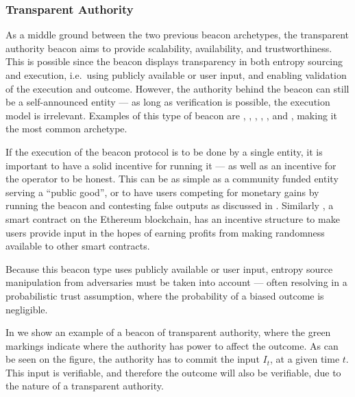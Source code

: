 \subsubsection{Transparent Authority}\label{ssub:transparent_authority}
As a middle ground between the two previous beacon archetypes, the transparent authority beacon aims to provide scalability, availability, and trustworthiness.
This is possible since the beacon displays transparency in both entropy sourcing and execution, i.e.\ using publicly available or user input, and enabling validation of the execution and outcome.
However, the authority behind the beacon can still be a self-announced entity --- as long as verification is possible, the execution model is irrelevant.
Examples of this type of beacon are , , , , ,  and , making it the most common archetype.

If the execution of the beacon protocol is to be done by a single entity, it is important to have a solid incentive for running it --- as well as an incentive for the operator to be honest.
This can be as simple as a community funded entity serving a \enquote{public good}, or to have users competing for monetary gains by running the beacon and contesting false outputs as discussed in \citet{bunz2017proofsof}.
Similarly , a smart contract on the Ethereum blockchain, has an incentive structure to make users provide input in the hopes of earning profits from making randomness available to other smart contracts.

Because this beacon type uses publicly available or user input, entropy source manipulation from adversaries must be taken into account --- often resolving in a probabilistic trust assumption, where the probability of a biased outcome is negligible.

In  we show an example of a beacon of transparent authority, where the green markings indicate where the authority has power to affect the outcome.
As can be seen on the figure, the authority has to commit the input $I_t$, at a given time $t$.
This input is verifiable, and therefore the outcome will also be verifiable, due to the nature of a transparent authority.


